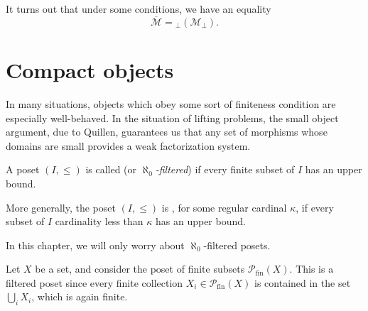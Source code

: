 \documentclass[main.tex]{subfiles}
\begin{document}
It turns out that under some conditions, we have an equality
\begin{equation*}
  \overline{\mathcal{M}} = {}_{\perp}(\mathcal{M}_{\perp}).
\end{equation*}

\section{Compact objects}
\label{sec:compact_objects}

In many situations, objects which obey some sort of finiteness condition are especially well-behaved. In the situation of lifting problems, the small object argument, due to Quillen, guarantees us that any set of morphisms whose domains are small provides a weak factorization system.

\begin{definition}
  \label{def:filtered_poset}
  A poset $(I, \leq)$ is called  (or \emph{$\aleph_{0}$-filtered}) if every finite subset of $I$ has an upper bound.

  More generally, the poset $(I, \leq)$ is , for some regular cardinal $\kappa$, if every subset of $I$ cardinality less than $\kappa$ has an upper bound.
\end{definition}

In this chapter, we will only worry about $\aleph_{0}$-filtered posets.

\begin{example}
  \label{eg:poset_of_finite_subsets}
  Let $X$ be a set, and consider the poset of finite subsets $\mathcal{P}_{\mathrm{fin}}(X)$. This is a filtered poset since every finite collection $X_{i} \in \mathcal{P}_{\mathrm{fin}}(X)$ is contained in the set $\bigcup_{i} X_{i}$, which is again finite.
\end{example}
\end{document}
